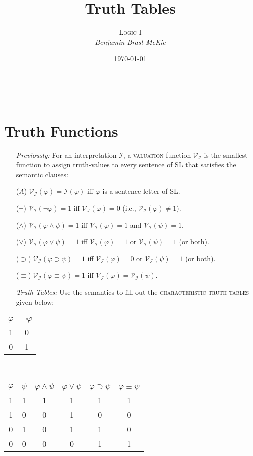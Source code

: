 \documentclass[a4paper, 11pt]{article} %
\title{\textbf{Truth Tables}} %
\author{\textsc{Logic I}\\ \em Benjamin Brast-McKie} %
\date{\today} %
\makeatletter
\newcommand{\I}{\mathcal{I}}
\newcommand{\V}[1]{\mathcal{V}_{#1}} %
\renewcommand{\maketitle}{ %
\begin{flushright} %
{\LARGE\@title} %

\vspace{10pt} %

{\@author} %
\\\@date %

\vspace{-10pt} %
\end{flushright}
}
\makeatother
\begin{document}
\maketitle %

\thispagestyle{empty}


\section*{Truth Functions}

\begin{enumerate}[leftmargin=1.5in,labelsep=.15in] %
  \item[\it Previously:] For an interpretation $\I$, a \textsc{valuation} function $\V{\I}$ is the smallest function to assign truth-values to every sentence of SL that satisfies the semantic clauses:
    \item[($A$)] $\V{\I}(\varphi)=\I(\varphi)$ iff $\varphi$ is a sentence letter of SL.
    \item[($\neg$)] $\V{\I}(\neg\varphi)=1$ iff $\V{\I}(\varphi)=0$ (i.e., $\V{\I}(\varphi)\neq 1$).
    \item[($\wedge$)] $\V{\I}(\varphi \wedge \psi)=1$ iff $\V{\I}(\varphi)=1$ and $\V{\I}(\psi)=1$.
    \item[($\vee$)] $\V{\I}(\varphi \vee \psi)=1$ iff $\V{\I}(\varphi)=1$ or $\V{\I}(\psi)=1$ (or both).
    \item[($\supset$)] $\V{\I}(\varphi \supset \psi)=1$ iff $\V{\I}(\varphi)=0$ or $\V{\I}(\psi)=1$ (or both).
    \item[($\equiv$)] $\V{\I}(\varphi \equiv \psi)=1$ iff $\V{\I}(\varphi)=\V{\I}(\psi)$.
  \item[\it Truth Tables:] Use the semantics to fill out the \textsc{characteristic truth tables} given below:
\end{enumerate}


\begin{table}[htb]
\begin{center}
\begin{tabular}{c|c}
$\varphi$ & $\neg\varphi$\\
\hline
1 & 0\\
0 & 1 
\end{tabular}
\ \ \ \ 
\begin{tabular}{c|c|c|c|c|c}
$\varphi$ & $\psi$ & $\varphi\wedge\psi$ & $\varphi\vee\psi$ & $\varphi\supset\psi$ & $\varphi\equiv\psi$\\
\hline
1 & 1 & 1 & 1 & 1 & 1\\
1 & 0 & 0 & 1 & 0 & 0\\
0 & 1 & 0 & 1 & 1 & 0\\
0 & 0 & 0 & 0 & 1 & 1
\end{tabular}
\end{center}
\end{table}
\end{document}
